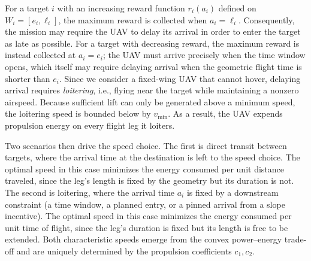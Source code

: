 \documentclass[11pt]{article}
\begin{document}
For a target $i$ with an increasing reward function $r_i(a_i)$ defined on
$W_i=[e_i,\ell_i]$, the maximum reward is collected when $a_i=\ell_i$. Consequently, the mission may require the UAV to delay its arrival in order to enter the target as late as possible. For a target with decreasing reward, the maximum reward is instead collected at $a_i = e_i$; the UAV must arrive precisely when the time window opens, which itself may require delaying arrival when the geometric flight time is shorter than $e_i$. Since we consider a fixed-wing UAV that cannot hover, delaying arrival requires \emph{loitering}, i.e., flying near the target while maintaining a nonzero airspeed. Because sufficient lift can only be generated above a minimum speed, the loitering speed is bounded below by $v_{\min}$. As a result, the UAV expends propulsion energy on every flight leg it loiters.

Two scenarios then drive the speed choice. The first is direct transit between targets, where the arrival time at the destination is left to the speed choice. The optimal speed in this case minimizes the energy consumed per unit distance traveled, since the leg's length is fixed by the geometry but its duration is not. The second is loitering, where the arrival time $a_i$ is fixed by a downstream constraint (a time window, a planned entry, or a pinned arrival from a slope incentive). The optimal speed in this case minimizes the energy consumed per unit time of flight, since the leg's duration is fixed but its length is free to be extended. Both characteristic speeds emerge from the convex power--energy trade-off and are uniquely determined by the propulsion coefficients $c_1, c_2$.
\end{document}
